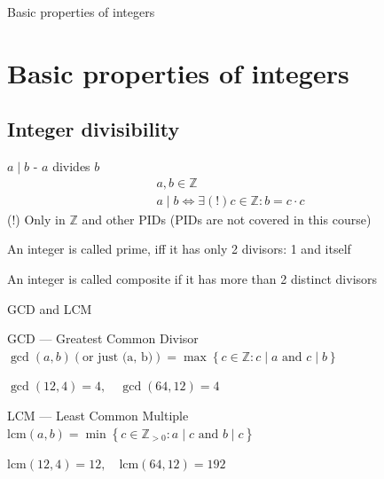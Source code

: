 \documentclass{beamer}
\begin{document}
\begin{frame}{Basic properties of integers}
    \section{Basic properties of integers}
    \subsection{Integer divisibility}
    \begin{definition}
        $a \mid b$ - $a$ divides $b$
        \begin{eqnarray*}
                & a, b \in \mathbb{Z} & \\
                & a \mid b \iff \exists(!) c \in \mathbb{Z} : b = c \cdot c
        \end{eqnarray*}
        (!) Only in $\mathbb{Z}$ and other PIDs (PIDs are not covered in this course) 
    \end{definition}
    \begin{definition}
        An integer is called prime, iff it has only 2 divisors: 1 and itself
    \end{definition}
    \begin{definition}
        An integer is called composite if it has more than 2 distinct divisors
    \end{definition}
\end{frame}

\begin{frame}{GCD and LCM}
    \begin{definition}
        GCD --- Greatest Common Divisor \\
        $\gcd(a, b) (\text{or just (a, b)})= \max \left\{ c \in \mathbb{Z} : c \mid a \text{ and } c \mid b \right\}$
    \end{definition}
    \begin{example}
        $ \gcd(12, 4) = 4, \quad \gcd(64, 12) = 4 $ 
    \end{example}

    \begin{definition}
        LCM --- Least Common Multiple \\
        $\text{lcm}(a, b) = \min \left\{ c \in \mathbb{Z}_{> 0} : a \mid c \text{ and } b \mid c \right\}$
    \end{definition}
    \begin{example}
        $ \text{lcm}(12, 4) = 12, \quad \text{lcm}(64, 12) = 192 $
    \end{example}

\end{frame}
\end{document}
